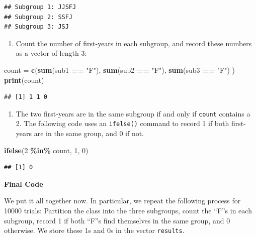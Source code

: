 \documentclass[
]{book}
\newenvironment{Shaded}{\begin{snugshade}}{\end{snugshade}}
\newcommand{\DecValTok}[1]{\textcolor[rgb]{0.00,0.00,0.81}{#1}}
\newcommand{\FunctionTok}[1]{\textcolor[rgb]{0.13,0.29,0.53}{\textbf{#1}}}
\newcommand{\NormalTok}[1]{#1}
\newcommand{\OtherTok}[1]{\textcolor[rgb]{0.56,0.35,0.01}{#1}}
\newcommand{\SpecialCharTok}[1]{\textcolor[rgb]{0.81,0.36,0.00}{\textbf{#1}}}
\newcommand{\StringTok}[1]{\textcolor[rgb]{0.31,0.60,0.02}{#1}}
\providecommand{\tightlist}{%
  \setlength{\itemsep}{0pt}\setlength{\parskip}{0pt}}
\theoremstyle{definition}
\theoremstyle{definition}
\theoremstyle{definition}
\theoremstyle{definition}
\theoremstyle{remark}
\begin{document}
\begin{verbatim}
## Subgroup 1: JJSFJ
## Subgroup 2: SSFJ
## Subgroup 3: JSJ
\end{verbatim}

\begin{enumerate}
\def\labelenumi{\arabic{enumi}.}
\setcounter{enumi}{2}
\tightlist
\item
  Count the number of first-years in each subgroup, and record these numbers as a vector of length 3:
\end{enumerate}

\begin{Shaded}
\begin{Highlighting}[]
\NormalTok{count }\OtherTok{=} \FunctionTok{c}\NormalTok{(}\FunctionTok{sum}\NormalTok{(sub1 }\SpecialCharTok{==} \StringTok{"F"}\NormalTok{),}
          \FunctionTok{sum}\NormalTok{(sub2 }\SpecialCharTok{==} \StringTok{"F"}\NormalTok{),}
          \FunctionTok{sum}\NormalTok{(sub3 }\SpecialCharTok{==} \StringTok{"F"}\NormalTok{)}
\NormalTok{          )}
\FunctionTok{print}\NormalTok{(count)}
\end{Highlighting}
\end{Shaded}

\begin{verbatim}
## [1] 1 1 0
\end{verbatim}

\begin{enumerate}
\def\labelenumi{\arabic{enumi}.}
\setcounter{enumi}{3}
\tightlist
\item
  The two first-years are in the same subgroup if and only if \texttt{count} contains a 2. The following code uses an \texttt{ifelse()} command to record 1 if both first-years are in the same group, and 0 if not.
\end{enumerate}

\begin{Shaded}
\begin{Highlighting}[]
\FunctionTok{ifelse}\NormalTok{(}\DecValTok{2} \SpecialCharTok{\%in\%}\NormalTok{ count, }\DecValTok{1}\NormalTok{, }\DecValTok{0}\NormalTok{)}
\end{Highlighting}
\end{Shaded}

\begin{verbatim}
## [1] 0
\end{verbatim}

\textbf{Final Code}

We put it all together now. In particular, we repeat the following process for 10000 trials: Partition the class into the three subgroups, count the ``F''s in each subgroup, record 1 if both ``F''s find themselves in the same group, and 0 otherwise. We store these 1s and 0s in the vector \texttt{results}.
\end{document}
